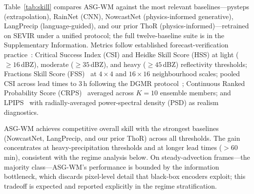 \documentclass[fleqn,10pt]{wlscirep}
\begin{document}
Table~\ref{tab:skill} compares ASG-WM against the most relevant baselines---pysteps (extrapolation), RainNet (CNN), NowcastNet (physics-informed generative), LangPrecip (language-guided), and our prior ThoR (physics-informed)---retrained on SEVIR under a unified protocol; the full twelve-baseline suite is in the Supplementary Information.
Metrics follow established forecast-verification practice~\cite{jolliffe2012forecast}: Critical Success Index (CSI) and Heidke Skill Score (HSS) at light (${\ge}16$\,dBZ), moderate (${\ge}35$\,dBZ), and heavy (${\ge}45$\,dBZ) reflectivity thresholds; Fractions Skill Score (FSS)~\cite{roberts2008fss} at $4{\times}4$ and $16{\times}16$ neighbourhood scales; pooled CSI across lead times to 3\,h following the DGMR protocol~\cite{ravuri2021dgmr}; Continuous Ranked Probability Score (CRPS)~\cite{gneiting2007crps,hersbach2000crps} averaged across $K{=}10$ ensemble members; and LPIPS~\cite{zhang2018lpips} with radially-averaged power-spectral density (PSD) as realism diagnostics.

ASG-WM achieves competitive overall skill with the strongest baselines (NowcastNet, LangPrecip, and our prior ThoR) across all thresholds.
The gain concentrates at heavy-precipitation thresholds and at longer lead times ($>$60\,min), consistent with the regime analysis below.
On steady-advection frames---the majority class---ASG-WM's performance is bounded by the information bottleneck, which discards pixel-level detail that black-box encoders exploit; this tradeoff is expected and reported explicitly in the regime stratification.
\end{document}
